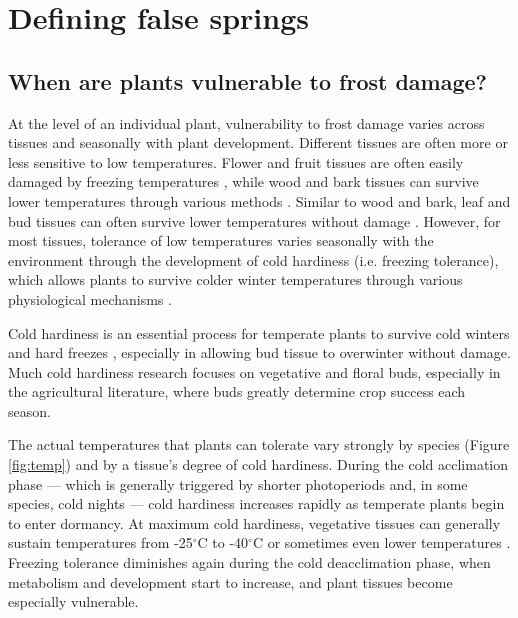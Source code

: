 \documentclass{article}\usepackage[]{graphicx}\usepackage[]{color}
\begin{document}
\section*{Defining false springs} 
\subsection*{When are plants vulnerable to frost damage?} 
At the level of an individual plant, vulnerability to frost damage varies across tissues and seasonally with plant development. Different tissues are often more or less sensitive to low temperatures. Flower and fruit tissues are often easily damaged by freezing temperatures \citep{Augspurger2009, Caradonna2016, Inouye2000, Lenz2013}, while wood and bark tissues can survive lower temperatures through various methods \citep{Strimbeck2015}. Similar to wood and bark, leaf and bud tissues can often survive lower temperatures without damage \citep{Charrier2011}. However, for most tissues, tolerance of low temperatures varies seasonally with the environment through the development of cold hardiness (i.e. freezing tolerance), which allows plants to survive colder winter temperatures through various physiological mechanisms \citep[e.g., deep supercooling, increased solute concentration, and an increase in dehydrins and other proteins,][] {Sakai1987, Strimbeck2015}. 

Cold hardiness is an essential process for temperate plants to survive cold winters and hard freezes \citep{Vitasse2014}, especially in allowing bud tissue to overwinter without damage. Much cold hardiness research focuses on vegetative and floral buds, especially in the agricultural literature, where buds greatly determine crop success each season.

The actual temperatures that plants can tolerate vary strongly by species (Figure \ref{fig:temp}) and by a tissue's degree of cold hardiness. During the cold acclimation phase --- which is generally triggered by shorter photoperiods \citep{Howe2003, Charrier2011, Strimbeck2015, Welling1997} and, in some species, cold nights \citep{Charrier2011, Heide2005} --- cold hardiness increases rapidly as temperate plants begin to enter dormancy. At maximum cold hardiness, vegetative tissues can generally sustain temperatures from -25$^{\circ}$C to -40$^{\circ}$C \citep{Charrier2011,Korner2012,Vitasse2014} or sometimes even lower temperatures \citep[to -60$^{\circ}$C in extreme cases,][] {Korner2012}. Freezing tolerance diminishes again during the cold deacclimation phase, when metabolism and development start to increase, and plant tissues become especially vulnerable. 
\end{document}
